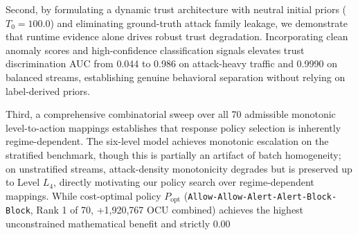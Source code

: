 \documentclass[journal,10pt,onecolumn]{IEEEtran}
\begin{document}
Second, by formulating a dynamic trust architecture with neutral initial priors ($T_0 = 100.0$) and eliminating ground-truth attack family leakage, we demonstrate that runtime evidence alone drives robust trust degradation. Incorporating clean anomaly scores and high-confidence classification signals elevates trust discrimination AUC from 0.044 to 0.986 on attack-heavy traffic and 0.9990 on balanced streams, establishing genuine behavioral separation without relying on label-derived priors.

Third, a comprehensive combinatorial sweep over all 70 admissible monotonic level-to-action mappings establishes that response policy selection is inherently regime-dependent. The six-level model achieves monotonic escalation on the stratified benchmark, though this is partially an artifact of batch homogeneity; on unstratified streams, attack-density monotonicity degrades but is preserved up to Level $L_4$, directly motivating our policy search over regime-dependent mappings. While cost-optimal policy $P_{\text{opt}}$ (\texttt{Allow-Allow-Alert-Alert-Block-Block}, Rank 1 of 70, +1,920,767 OCU combined) achieves the highest unconstrained mathematical benefit and strictly 0.00%
\end{document}

